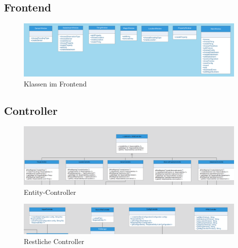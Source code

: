 \clearpage
\subsection{Frontend}

\begin{figure}[!h]
\centering
\includegraphics[scale=0.36]{uml/screenshots/frontend}
\caption{Klassen im Frontend}
\end{figure}



\clearpage
\subsection{Controller}
\begin{figure}[!h]
\centering
\includegraphics[scale=0.365]{uml/screenshots/entity-controller}
\caption{Entity-Controller}
\end{figure}
\begin{figure}[!h]
\centering
\includegraphics[scale=0.4]{uml/screenshots/controller}
\caption{Restliche Controller}
\end{figure}



\clearpage

\clearpage

\clearpage

\clearpage

\clearpage

\clearpage

